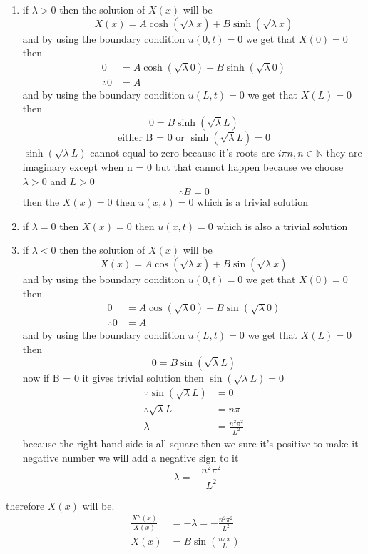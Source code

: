 \documentclass[]{article}
\begin{document}
\begin{enumerate}
\item if $\lambda > 0$ then the solution of $X(x)$ will be 
\[
X(x) = A \cosh(\sqrt{\lambda} x) + B \sinh(\sqrt{\lambda}x)
\]
and by using the boundary condition $u(0,t) = 0$ we get that $X(0) = 0$ then
\begin{align*}
    0 &= A \cosh(\sqrt{\lambda} 0) + B \sinh(\sqrt{\lambda}0)\\
    \therefore 0 &= A
\end{align*}
and by using the boundary condition $u(L,t) = 0$ we get that $X(L) = 0$ then
\[
    0 = B \sinh(\sqrt{\lambda}L)    
\]
\[
    \text{either B = 0 or } \sinh(\sqrt{\lambda}L) = 0    
\]    
$\sinh(\sqrt{\lambda}L)$ cannot equal to zero because it's roots are $i \pi n , n \in \mathbb{N}$ 
they are imaginary except when n = 0 but that cannot happen because we choose $\lambda > 0$ and $L > 0$
\[
    \therefore B = 0
\]
then the $X(x) = 0$ then $u(x,t) = 0 $ which is a trivial solution
\item if $\lambda = 0$ then $X(x) = 0 $ then $u(x,t) = 0 $ which is also a trivial solution
\item if $\lambda < 0$ then the solution of $X(x)$ will be 
\[
X(x) = A \cos(\sqrt{\lambda} x) + B \sin(\sqrt{\lambda}x)
\]
and by using the boundary condition $u(0,t) = 0$ we get that $X(0) = 0$ then
\begin{align*}
    0 &= A \cos(\sqrt{\lambda} 0) + B \sin(\sqrt{\lambda}0)\\
    \therefore 0 &= A
\end{align*} 
and by using the boundary condition $u(L,t) = 0$ we get that $X(L) = 0$ then
\[
    0 = B \sin  (\sqrt{\lambda}L)    
\]
now if B = 0 it gives trivial solution then $\sin(\sqrt{\lambda}L) = 0$ 
\begin{align*}
    \because \sin(\sqrt{\lambda}L) &= 0 \\
    \therefore \sqrt{\lambda} L &= n \pi \\
    \lambda &= \frac{n^2 \pi^2}{L^2}
\end{align*}
because the right hand side is all square then we sure it's positive to make it negative number we will add a negative sign to it
\[
    -\lambda = -\frac{n^2 \pi^2}{L^2}
\]
\end{enumerate}
therefore $X(x)$ will be.
\begin{align*}
\frac{X''(x)}{X(x)} &= -\lambda = -\frac{n^2 \pi^2}{L^2}
\\
X(x) &= B \sin\left(\frac{n\pi x}{L}\right)
\end{align*}
\end{document}
